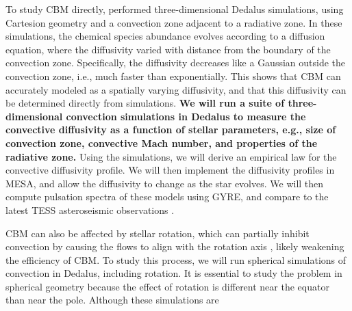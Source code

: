 To study CBM directly, \citet{Lecoanet_2016a} performed three-dimensional Dedalus simulations, using Cartesion geometry and a convection zone adjacent to a radiative zone. In these simulations, the chemical species abundance evolves according to a diffusion equation, where the diffusivity varied with distance from the boundary of the convection zone. Specifically, the diffusivity decreases like a Gaussian outside the convection zone, i.e., much faster than exponentially. This shows that CBM can accurately modeled as a spatially varying diffusivity, and that this diffusivity can be determined directly from simulations. \textbf{We will run a suite of three-dimensional convection simulations in Dedalus to measure the convective diffusivity as a function of stellar parameters, e.g., size of convection zone, convective Mach number, and properties of the radiative zone.} Using the simulations, we will derive an empirical law for the convective diffusivity profile. We will then implement the diffusivity profiles in MESA, and allow the diffusivity to change as the star evolves.  We will then compute pulsation spectra of these models using GYRE, and compare to the latest TESS asteroseismic observations \citep[similar to][]{moravveji:15,Ghasemi_2016}.

CBM can also be affected by stellar rotation, which can partially inhibit convection by causing the flows to align with the rotation axis \cite[e.g.,][]{Featherstone_2016}, likely weakening the efficiency of CBM. To study this process, we will run spherical simulations of convection in Dedalus, including rotation. It is essential to study the problem in spherical geometry because the effect of rotation is different near the equator than near the pole. Although these simulations are 